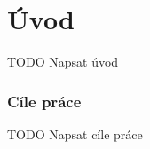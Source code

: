 \chapter*{Úvod}
\setcounter{page}{1}

TODO Napsat úvod

\subsection*{Cíle práce}
TODO Napsat cíle práce
